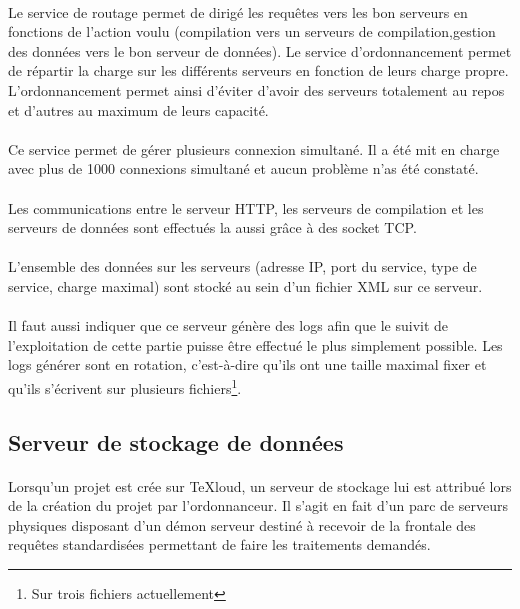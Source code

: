 \documentclass[a4paper,12pt]{article}
\begin{document}
\paragraph*{}
Le service de routage permet de dirigé les requêtes vers les bon serveurs en fonctions de l'action voulu (compilation vers un serveurs de compilation,gestion des données vers le bon serveur de données). Le service d'ordonnancement permet de répartir la charge sur les différents serveurs en fonction de leurs charge propre. L'ordonnancement permet ainsi d'éviter d'avoir des serveurs totalement au repos et d'autres au maximum de leurs capacité.

\paragraph*{}
Ce service permet de gérer plusieurs connexion simultané. Il a été mit en charge avec plus de 1000 connexions simultané et aucun problème n'as été constaté.

\paragraph*{}
Les communications entre le serveur HTTP, les serveurs de compilation et les serveurs de données sont effectués la aussi grâce à des socket TCP.

\paragraph*{}
L'ensemble des données sur les serveurs (adresse IP, port du service, type de service, charge maximal) sont stocké au sein d'un fichier XML sur ce serveur.

\paragraph*{}
Il faut aussi indiquer que ce serveur génère des logs afin que le suivit de l'exploitation de cette partie puisse être effectué le plus simplement possible. Les logs générer sont en rotation, c'est-à-dire qu'ils ont une taille maximal fixer et qu'ils s'écrivent sur plusieurs fichiers\footnote{Sur trois fichiers actuellement}.


\subsection{Serveur de stockage de données}
\paragraph*{}
Lorsqu'un projet est crée sur TeXloud, un serveur de stockage lui est attribué lors de la création du projet par l'ordonnanceur.
Il s'agit en fait d'un parc de serveurs physiques disposant d'un démon serveur destiné à recevoir de la frontale des requêtes standardisées permettant de faire les traitements demandés.
\end{document}
